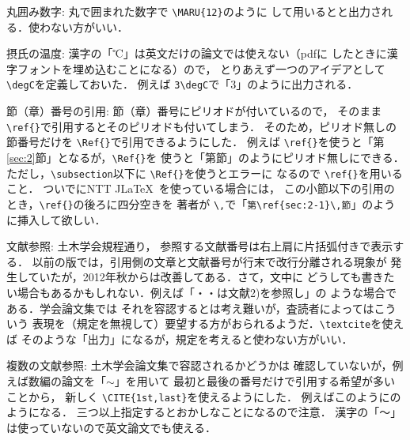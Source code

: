 \documentclass[dvipdfmx,onecolumn]{jsce}  %
\begin{document}
\begin{Description}
%
\item[丸囲み数字:] 丸で囲まれた数字で \verb+\MARU{12}+のように
して用いるとと出力される．使わない方がいい．
%
\item[摂氏の温度:] 漢字の「℃」は英文だけの論文では使えない（pdfに
したときに漢字フォントを埋め込むことになる）ので，
とりあえず一つのアイデアとして \verb+\degC+を定義しておいた．
例えば \verb+3\degC+で「3\degC」のように出力される．
%
\item[節（章）番号の引用:] 節（章）番号にピリオドが付いているので，
そのまま \verb+\ref{}+で引用するとそのピリオドも付いてしまう．
そのため，ピリオド無しの節番号だけを \verb+\Ref{}+で引用できるようにした．
例えば \verb+\ref{}+を使うと「第\ref{sec:2}節」となるが，\verb+\Ref{}+を
使うと「第節」のようにピリオド無しにできる．
ただし，\verb+\subsection+以下に \verb+\Ref{}+を使うとエラーに
なるので \verb+\ref{}+を用いること．
ついでにNTT J\LaTeX\ を使っている場合には，
この小節以下の引用のとき，\verb+\ref{}+の後ろに四分空きを
著者が \verb+\,+で「\verb+第\ref{sec:2-1}\,節+」のように挿入して欲しい．
%
%
\item[文献参照:] 土木学会規程通り，
参照する文献番号は右上肩に片括弧付きで表示する．
以前の版では，引用側の文章と文献番号が行末で改行分離される現象が
発生していたが，2012年秋からは改善してある．さて，文中に
どうしても書きたい場合もあるかもしれない．例えば「・・は文献2)を参照し」の
ような場合である．学会論文集では
それを容認するとは考え難いが，査読者によってはこういう
表現を（規定を無視して）要望する方がおられるようだ．\verb+\textcite+を使えば
そのような「出力\textcite{1}」になるが，規定を考えると使わない方がいい．
%
\item[複数の文献参照:] 土木学会論文集で容認されるかどうかは
確認していないが，例えば数編の論文を「$\sim$」を用いて
最初と最後の番号だけで引用する希望が多いことから，
新しく \verb+\CITE{1st,last}+を使えるようにした．
例えばこのようにのようになる．
三つ以上指定するとおかしなことになるので注意．
漢字の「〜」は使っていないので英文論文でも使える．
\end{Description}
\end{document}
